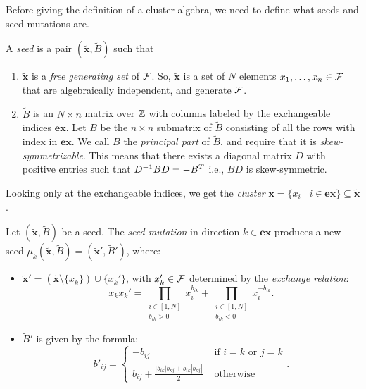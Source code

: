 \documentclass{article}
\newcommand{\ex}{\mathbf{ex}}
\newcommand{\bx}{\mathbf{x}}
\newcommand{\tbx}{\tilde{\bx}}
\newcommand{\tB}{\tilde{B}}
\begin{document}
Before giving the definition of a cluster algebra, we need to define what seeds and
seed mutations are.
\begin{definition}
	A \emph{seed} is a pair $(\tilde{\mathbf{x}}, \tilde{B})$ such that
	\begin{enumerate}
		\item $\tilde{\mathbf{x}}$ is a \emph{free generating set} of $\mathcal{F}$.
		      So, $\tilde{\mathbf{x}}$ is a set of $N$ elements $x_1, \dots, x_n \in \mathcal{F}$ that are algebraically independent, and generate $\mathcal{F}$.
		\item $\tilde{B}$ is an $N \times n$ matrix over $\mathbb{Z}$ with columns labeled by the exchangeable
		      indices $\ex$. Let $B$ be the $n \times n$ submatrix
		      of $\tilde{B}$ consisting of all the rows with index in $\ex$.
		      We call $B$ the \emph{principal part} of $\tilde{B}$, and require that it is \emph{skew-symmetrizable}.
		      This means that there exists a diagonal matrix $D$ with positive entries
		      such that $D^{-1} B D = - B^T$ i.e., $BD$ is skew-symmetric.
	\end{enumerate}
\end{definition}

Looking only at the exchangeable indices, we get the \emph{cluster} $\mathbf{x} = \{x_i
	\mid i \in \ex \} \subseteq \tilde{\mathbf{x}}$.
\begin{definition}
	Let $(\tilde{\mathbf{x}}, \tilde{B})$ be a seed.
	The \emph{seed mutation} in direction $k \in \ex$
	produces a new seed $\mu_k(\tilde{\mathbf{x}}, \tB) = (\tilde{\bx}', \tB')$, where:
	\begin{itemize}
		\item $\tbx' = (\tbx \setminus \{x_k\}) \cup \{x_k'\}$,
		      with $x_k' \in \mathcal{F}$ determined by the \emph{exchange relation}:
		      \begin{equation}
			      \label{eq:exchange_relation}
			      x_kx_k' = \prod_{\substack{i \in [1,N] \\ b_{ik} > 0}}x_i^{b_{ik}} + \prod_{\substack{i \in [1, N] \\ b_{ik} < 0}}x_i^{-b_{ik}}.
		      \end{equation}
		\item $\tB'$ is given by the formula:
		      \begin{equation}
			      \label{eq:matrix_mutation}
			      b'_{ij} =
			      \begin{cases}
				      -b_{ij}                                            & \text{ if } i=k \text{ or } j=k \\
				      b_{ij} + \frac{|b_{ik}|b_{kj} + b_{ik}|b_{kj}|}{2} & \text{ otherwise}
			      \end{cases}
			      .
		      \end{equation}
	\end{itemize}
\end{definition}
\end{document}

